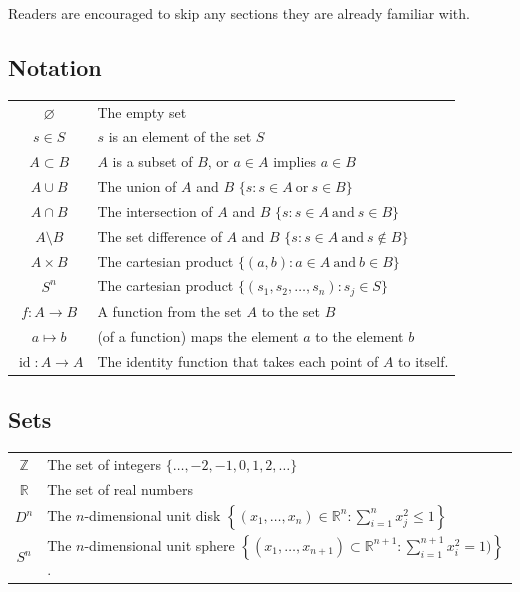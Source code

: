 \documentclass{amsart}
\DeclareMathOperator{\id}{id}
\begin{document}
Readers are encouraged to skip any sections they are already familiar with.

\subsection*{Notation}
\begin{tabular}{c l}
	\(\varnothing\) & The empty set\\
	\(s\in S\) & \(s\) is an element of the set \(S\)\\
	\(A\subset B\) & \(A\) is a subset of \(B\), or \(a\in A\) implies \(a\in B\)\\
	\(A \cup B\) & The union of \(A\) and \(B\) \(\{s : s\in A~\text{or}~s\in
	B\}\)\\
	\(A\cap B\) & The intersection of \(A\) and \(B\) \(\{s: s\in
	A~\text{and}~s\in B\}\)\\
	\(A\setminus B\) & The set difference of \(A\) and \(B\) \(\{s : s\in
	A~\text{and}~s\notin B\}\)\\
	\(A\times B\) & The cartesian product \(\{(a, b) : a\in A ~\text{and}~ b\in
	B\}\)\\
	\(S^n\) & The cartesian product \(\{(s_1,
	s_2, \ldots, s_n) : s_j\in S\}\)\\
	\(f: A\to B\) & A function from the set \(A\) to the set \(B\)\\
	\(a\mapsto b\) & (of a function) maps the element \(a\) to the element
	\(b\)\\
	\(\id: A\to A\) & The identity function that takes each point of \(A\) to
	itself.
\end{tabular}

\subsection*{Sets}
\begin{tabular}{c l}
   \(\mathbb{Z}\) & The set of integers \(\{\ldots, -2, -1, 0, 1, 2, \ldots\}\) \\
   \(\mathbb{R}\) & The set of real numbers \\
	\(D^n\) & The \(n\)-dimensional unit disk \(\left\{(x_1, \ldots,
		x_n)\in\mathbb{R}^n :
	\sum_{i=1}^n x_j^2 \le 1\right\}\)\\
	\(S^n\) & The \(n\)-dimensional unit sphere \(\left\{(x_1, \ldots,
		x_{n+1})\subset\mathbb{R}^{n+1} : \sum_{i=1}^{n+1}x_i^2 = 1)\right\}\).
\end{tabular}
\end{document}
